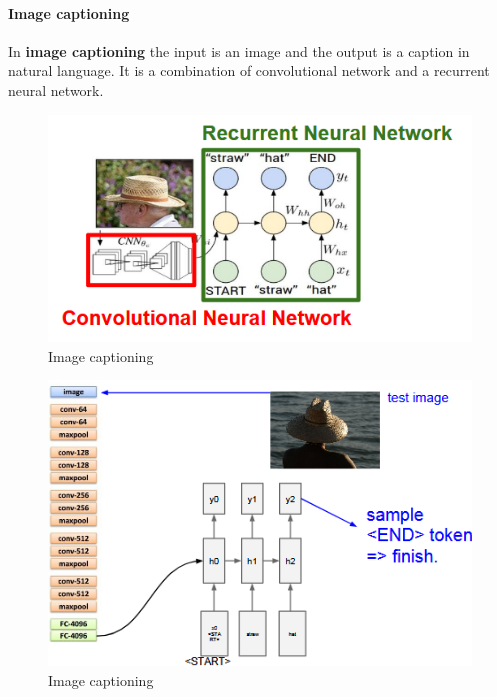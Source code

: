 \documentclass[11pt]{article}
\begin{document}
\paragraph{Image captioning}
In \textbf{image captioning} the input is an image and the output is a caption in natural language. It is a combination of convolutional network and a recurrent neural network.



\begin{minipage}{0.5\textwidth}
\begin{figure} [H]
\centering 
\includegraphics[scale=0.8]{L917.pdf}
\caption{ Image captioning}
\label{fig:L917}
\end{figure}
\end{minipage}
\begin{minipage}{0.5\textwidth}
\begin{figure} [H]
\centering 
\includegraphics[scale=0.83]{L918.pdf}
\caption{ Image captioning}
\label{fig:L918}
\end{figure}
\end{minipage}
\end{document}
